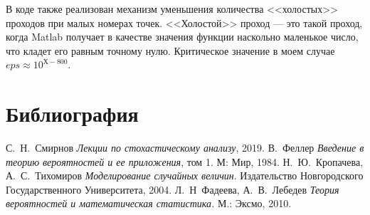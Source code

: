 \documentclass[oneside, final, 12pt]{article}
\begin{document}
	В коде также реализован механизм уменьшения количества <<холостых>> проходов при малых
	номерах точек. <<Холостой>> проход --- это такой проход, 
	когда Matlab получает в качестве значения функции наскольно маленькое число, что кладет
	его равным точному нулю. Критическое значение в моем случае $eps \approx 10^{Х-800}$. 



\newpage
\section{Библиография}
	\begin{thebibliography}{99}
		 С.~Н.~Смирнов \textit{Лекции по стохастическому анализу}, 2019.
		 В.~Феллер \textit{Введение в теорию вероятностей и ее приложения}, 
			том 1. М: Мир, 1984.
		  Н.~Ю.~Кропачева, А.~С.~Тихомиров \textit{Моделирование случайных величин}. 
						Издательство Новгородского Государственного Университета, 2004.
		  Л.~Н~Фадеева, А.~В.~Лебедев   \textit{Теория вероятностей 
									и математическая статистика.} М.: Эксмо, 2010.
	\end{thebibliography}
\end{document}
